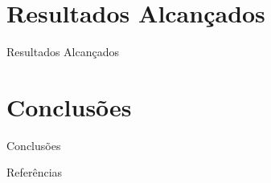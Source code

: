 \documentclass{beamer}
\begin{document}
\section{Resultados Alcançados}
\begin{frame}{Resultados Alcançados}
\end{frame}

\section{Conclusões}
\begin{frame}{Conclusões}
\end{frame}


\begin{frame}{Referências}


\end{frame}

\begin{frame}
\maketitle
\end{frame}
\end{document}

